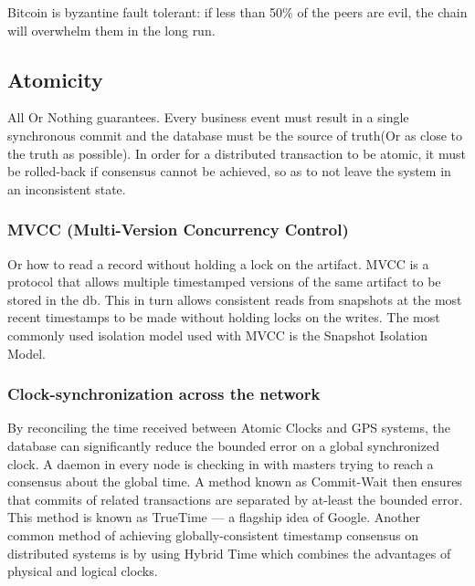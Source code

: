 Bitcoin is byzantine fault tolerant: if less than 50\% of the peers are
evil, the chain will overwhelm them in the long run.

\hypertarget{atomicity}{%
\subsection{Atomicity}\label{atomicity}}

All Or Nothing guarantees. Every business event must result in a single
synchronous commit and the database must be the source of truth(Or as
close to the truth as possible). In order for a distributed transaction
to be atomic, it must be rolled-back if consensus cannot be achieved, so
as to not leave the system in an inconsistent state.

\hypertarget{mvcc-multi-version-concurrency-control}{%
\subsubsection{MVCC (Multi-Version Concurrency
Control)}\label{mvcc-multi-version-concurrency-control}}

Or how to read a record without holding a lock on the artifact. MVCC is
a protocol that allows multiple timestamped versions of the same
artifact to be stored in the db. This in turn allows consistent reads
from snapshots at the most recent timestamps to be made without holding
locks on the writes. The most commonly used isolation model used with
MVCC is the Snapshot Isolation Model.

\hypertarget{clock-synchronization-across-the-network}{%
\subsubsection{Clock-synchronization across the
network}\label{clock-synchronization-across-the-network}}

By reconciling the time received between Atomic Clocks and GPS systems,
the database can significantly reduce the bounded error on a global
synchronized clock. A daemon in every node is checking in with masters
trying to reach a consensus about the global time. A method known as
Commit-Wait then ensures that commits of related transactions are
separated by at-least the bounded error. This method is known as
TrueTime --- a flagship idea of Google. Another common method of
achieving globally-consistent timestamp consensus on distributed systems
is by using Hybrid Time which combines the advantages of physical and
logical clocks.
